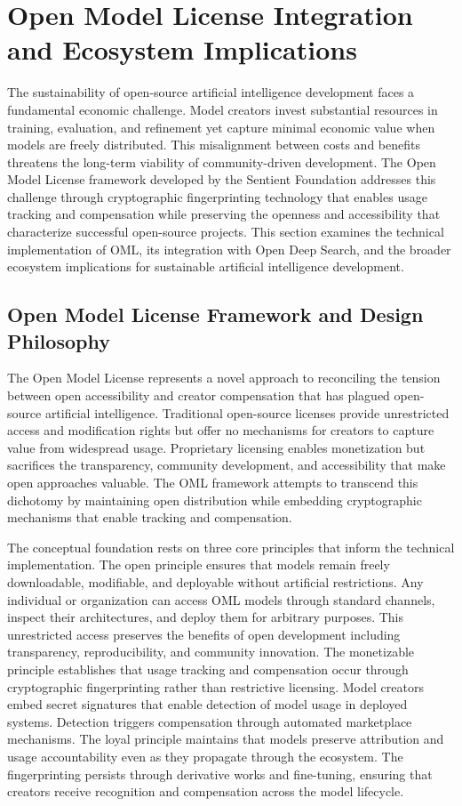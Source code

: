 \section{Open Model License Integration and Ecosystem Implications}

The sustainability of open-source artificial intelligence development faces a fundamental economic challenge. Model creators invest substantial resources in training, evaluation, and refinement yet capture minimal economic value when models are freely distributed. This misalignment between costs and benefits threatens the long-term viability of community-driven development. The Open Model License framework developed by the Sentient Foundation addresses this challenge through cryptographic fingerprinting technology that enables usage tracking and compensation while preserving the openness and accessibility that characterize successful open-source projects. This section examines the technical implementation of OML, its integration with Open Deep Search, and the broader ecosystem implications for sustainable artificial intelligence development.

\subsection{Open Model License Framework and Design Philosophy}

The Open Model License represents a novel approach to reconciling the tension between open accessibility and creator compensation that has plagued open-source artificial intelligence. Traditional open-source licenses provide unrestricted access and modification rights but offer no mechanisms for creators to capture value from widespread usage. Proprietary licensing enables monetization but sacrifices the transparency, community development, and accessibility that make open approaches valuable. The OML framework attempts to transcend this dichotomy by maintaining open distribution while embedding cryptographic mechanisms that enable tracking and compensation.

The conceptual foundation rests on three core principles that inform the technical implementation. The open principle ensures that models remain freely downloadable, modifiable, and deployable without artificial restrictions. Any individual or organization can access OML models through standard channels, inspect their architectures, and deploy them for arbitrary purposes. This unrestricted access preserves the benefits of open development including transparency, reproducibility, and community innovation. The monetizable principle establishes that usage tracking and compensation occur through cryptographic fingerprinting rather than restrictive licensing. Model creators embed secret signatures that enable detection of model usage in deployed systems. Detection triggers compensation through automated marketplace mechanisms. The loyal principle maintains that models preserve attribution and usage accountability even as they propagate through the ecosystem. The fingerprinting persists through derivative works and fine-tuning, ensuring that creators receive recognition and compensation across the model lifecycle.

